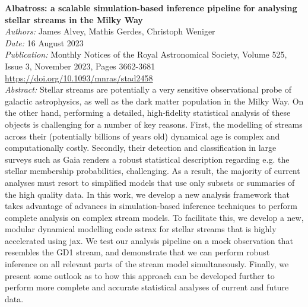\documentclass[11pt]{article}
\begin{document}
\textbf{Albatross: a scalable simulation-based inference pipeline for analysing stellar streams in the Milky Way}\\
\textit{Authors:} James Alvey, Mathis Gerdes, Christoph Weniger\\
\textit{Date:} 16 August 2023 \\
\textit{Publication:} Monthly Notices of the Royal Astronomical Society, Volume 525, Issue 3, November 2023, Pages 3662-3681 \\
\href{https://doi.org/10.1093/mnras/stad2458}{https://doi.org/10.1093/mnras/stad2458}\\
\textit{Abstract:} Stellar streams are potentially a very sensitive observational probe of galactic astrophysics, as well as the dark matter population in the Milky Way. On the other hand, performing a detailed, high-fidelity statistical analysis of these objects is challenging for a number of key reasons. First, the modelling of streams across their (potentially billions of years old) dynamical age is complex and computationally costly. Secondly, their detection and classification in large surveys such as Gaia renders a robust statistical description regarding e.g. the stellar membership probabilities, challenging. As a result, the majority of current analyses must resort to simplified models that use only subsets or summaries of the high quality data. In this work, we develop a new analysis framework that takes advantage of advances in simulation-based inference techniques to perform complete analysis on complex stream models. To facilitate this, we develop a new, modular dynamical modelling code sstrax for stellar streams that is highly accelerated using jax. We test our analysis pipeline on a mock observation that resembles the GD1 stream, and demonstrate that we can perform robust inference on all relevant parts of the stream model simultaneously. Finally, we present some outlook as to how this approach can be developed further to perform more complete and accurate statistical analyses of current and future data.
\end{document}
